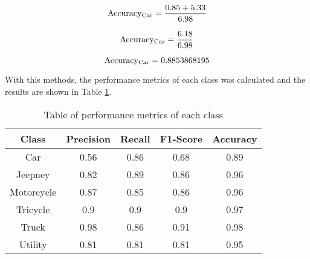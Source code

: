 \[{\text{Accuracy}\textsubscript{Car}}= \frac{0.85 + 5.33}{6.98} \]

\[{\text{Accuracy}\textsubscript{Car}}=  \frac{6.18}{6.98} \]


\[{\text{Accuracy}\textsubscript{Car}}= 0.8853868195 \]


With this methods, the performance metrics of each class was calculated and the results are shown in Table \ref{tab:perf_mat}. 


\begin{table}[ht]   %
	\centering
	\caption{Table of performance metrics of each class} \vspace{0.25em}
	\begin{tabular}{c|c|c|c|c} \hline
		\centering \textbf{Class} & \textbf{Precision} & \textbf{Recall} & \textbf{F1-Score} & \textbf{Accuracy}\\ \hline
		Car & 0.56 & 0.86  & 0.68 & 0.89 \\ \hline
		Jeepney & 0.82 & 0.89  & 0.86 & 0.96\\ \hline
		Motorcycle& 0.87  & 0.85   & 0.86 & 0.96 \\ \hline
		Tricycle   & 0.9   & 0.9 & 0.9 & 0.97\\ \hline
		Truck & 0.98 & 0.86 & 0.91 & 0.98 \\ \hline
		Utility & 0.81 & 0.81 & 0.81 & 0.95\\ \hline
		
	\end{tabular}
	\label{tab:perf_mat}
\end{table}


